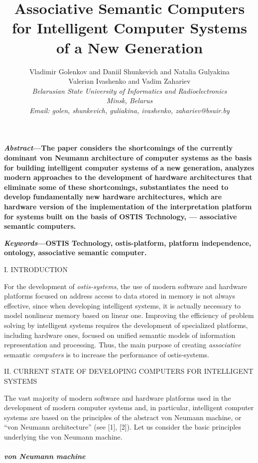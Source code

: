 \documentclass{article}
\title{\huge\bfseries Associative Semantic Computers for Intelligent Computer Systems of a New Generation\\}
\author{
 Vladimir Golenkov and Daniil Shunkevich and Natalia Gulyakina\\
 Valerian Ivashenko and Vadim Zahariev\\
 \itshape Belarusian State University of Informatics and Radioelectronics\\
 Minsk, Belarus\\
 Email: {golen, shunkevich, guliakina, ivashenko, zahariev}@bsuir.by}\\
\date{}
\begin{document}
\maketitle  
\begin{multicols}{2}
\textbf{\small\textit{Abstract}—The paper considers the shortcomings of the currently dominant von Neumann architecture of computer systems as the basis for building intelligent computer systems of a new generation, analyzes modern approaches to the development of hardware architectures that eliminate some of these shortcomings, substantiates the need to develop fundamentally new hardware architectures, which are hardware version of the implementation of the interpretation platform for systems built on the basis of OSTIS Technology,
— associative semantic computers.} \par
\small\textbf{\textit{Keywords}—OSTIS Technology, ostis-platform, platform
independence, ontology, associative semantic computer.}
\begin{center}
    I. INTRODUCTION \\
\end{center}
\par For the development of \textit{ostis-systems}, the use of modern software and hardware platforms focused on address access to data stored in memory is not always effective, since when developing intelligent systems, it is actually necessary to model nonlinear memory based on linear one. Improving the efficiency of problem solving by intelligent systems requires the development of specialized platforms, including hardware ones, focused on unified semantic models of information representation and processing. Thus, the main purpose of creating \textit{associative} semantic \textit{computers} is to increase the performance of ostis-systems.
\begin{center}
    II. CURRENT STATE OF DEVELOPING COMPUTERS FOR INTELLIGENT SYSTEMS \\
\end{center}
\par The vast majority of modern software and hardware platforms used in the development of modern computer systems and, in particular, intelligent computer systems are based on the principles of the abstract von Neumann machine, or “von Neumann architecture” (see [1], [2]). Let us consider the basic principles underlying the von Neumann machine. \\ \\
\textbf{\itshape von Neumann machine}\\

\end{multicols}
\end{document}
